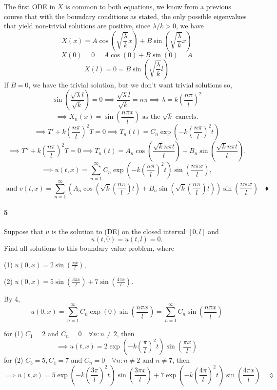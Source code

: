 \documentclass{article}
\begin{document}
The first ODE in $X$ is common to both equations, we know from a
previous course that with the boundary conditions as stated, the only
possible eigenvalues that yield non-trivial solutions are positive,
since $\lambda/k >0$, we have
\[X(x) = A\cos\left(\sqrt{\frac{\lambda}{k}} x\right) +
  B\sin\left(\sqrt{\frac{\lambda}{k}} x\right)\]
\[X(0) = 0 = A\cos(0) + B\sin(0) = A\]
\[X(l) = 0 = B\sin\left(\sqrt{\frac{\lambda}{k}}l\right) \]
If $B= 0$, we have the trivial solution, but we don't want trivial
solutions so,
\[\sin\left(\frac{\sqrt{\lambda} l}{\sqrt{k}}\right) = 0 \implies
  \frac{\sqrt{\lambda} l}{\sqrt{k}} = n\pi \implies
  \lambda =k \left(\frac{n\pi}{l}\right)^2\]
\[\implies X_n(x) = \sin\left( \frac{n\pi x}{l} \right)\text{ as the
  }\sqrt{k} \text{ cancels.}\]
\[\implies T'+k \left(\frac{n\pi}{l}\right)^2 T = 0 \implies T_n(t) = C_n\exp\left(-k\left(\frac{n\pi}{l}\right)^2 t\right)\]\[\implies T''+k
  \left(\frac{n\pi}{l}\right)^2 T = 0\implies T_n(t) =
  A_n\cos\left(\frac{\sqrt{k} n \pi
      t}{l}\right) + B_n\sin\left(\frac{\sqrt{k} n\pi t}{l}\right).\]
\[\implies u(t,x) = \sum_{n=1}^{\infty}C_n\exp\left(-k\left(
      \frac{n\pi}{l}\right)^2t \right)\sin\left( \frac{n\pi x}{l}
  \right),\]\[\text{ and }v(t,x) =  \sum_{n=1}^\infty\left(
    A_n\cos\left(\sqrt{k}\left(  \frac{ n\pi
        }{l}\right)t\right) + B_n\sin\left(\sqrt{k}\left(  \frac{n\pi}{l}\right) t\right) \right)\sin\left( \frac{n\pi x}{l}
  \right)\quad \blacklozenge\]

\paragraph{5} Suppose that $u$ is the solution to (DE) on the closed interval $[0, l]$ and
\[u(t, 0) = u(t, l) = 0.\]
Find all solutions to this boundary value problem, where

(1) $u(0, x) = 2 \sin\left( \frac{\pi x}{l} \right),$

(2) $u(0, x) = 5 \sin\left( \frac{3\pi x}{l} \right) +7 \sin\left( \frac{4\pi x}{l} \right).$


By 4,
\[u(0,x) = \sum_{n=1}^{\infty}C_n\exp\left(0\right)\sin\left( \frac{n\pi x}{l}
  \right) = \sum_{n=1}^{\infty}C_n\sin\left( \frac{n\pi x}{l}
  \right) \]

for (1) $C_1 = 2 $ and $ C_n = 0\quad  \forall n: n\neq 2$, then
\[\implies u(t,x) = 2\exp\left(-k\left(
      \frac{\pi}{l}\right)^2t \right)\sin\left( \frac{\pi x}{l}
  \right)\]
for (2) $C_3 = 5,C_4 = 7 $ and $ C_n = 0\quad  \forall n: n\neq 2$ and
$n \neq 7$, then
\[\implies u(t,x) = 5\exp\left(-k\left(
      \frac{3\pi}{l}\right)^2t \right)\sin\left( \frac{3\pi x}{l}
  \right)+7\exp\left(-k\left(
      \frac{4\pi}{l}\right)^2t \right)\sin\left( \frac{4\pi x}{l}
  \right)\quad \lozenge\]
\end{document}

